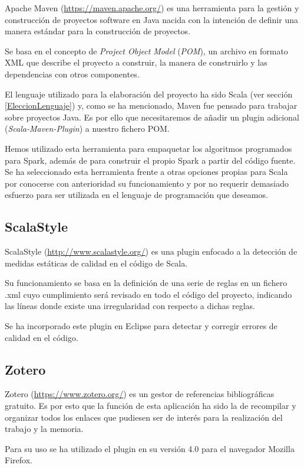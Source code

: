 Apache Maven (\url{https://maven.apache.org/}) es una herramienta para la gestión y construcción de proyectos software en Java nacida con la intención de definir una manera estándar para la construcción de proyectos.

Se basa en el concepto de \textit{Project Object Model} (\textit{POM}), un archivo en formato XML que describe el proyecto a construir, la manera de construirlo y  las dependencias con otros componentes.

El lenguaje utilizado para la elaboración del proyecto ha sido Scala (ver sección \ref{EleccionLenguaje}) y, como se ha mencionado, Maven fue pensado para trabajar sobre proyectos Java. Es por ello que necesitaremos de añadir un plugin adicional (\textit{Scala-Maven-Plugin}) a nuestro fichero POM.

Hemos utilizado esta herramienta para empaquetar los algoritmos programados para Spark, además de para construir el propio Spark a partir del código fuente. Se ha seleccionado esta herramienta frente a otras opciones propias para Scala por conocerse con anterioridad su funcionamiento y por no requerir demasiado esfuerzo para ser utilizada en el lenguaje de programación que deseamos.

\subsection{ScalaStyle}

ScalaStyle (\url{http://www.scalastyle.org/}) es una plugin enfocado a la detección de medidas estáticas de calidad en el código de Scala.

Su funcionamiento se basa en la definición de una serie de reglas en un fichero .xml cuyo cumplimiento será revisado en todo el código del proyecto, indicando las líneas donde existe una irregularidad con respecto a dichas reglas.

Se ha incorporado este plugin en Eclipse para detectar y corregir errores de calidad en el código.


\subsection{Zotero}
Zotero (\url{https://www.zotero.org/}) es un gestor de referencias bibliográficas gratuito. Es por esto que la función de esta aplicación ha sido la de recompilar y organizar todos los enlaces que pudiesen ser de interés para la realización del trabajo y la memoria.

Para su uso se ha utilizado el plugin en su versión 4.0 para el navegador Mozilla Firefox.


